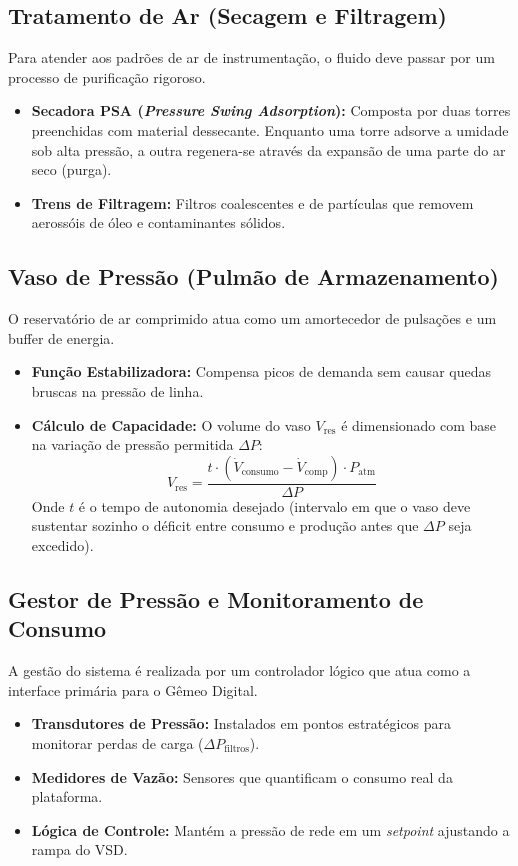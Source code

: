 \documentclass[12pt,a4paper]{article}
\numberwithin{equation}{section}
\numberwithin{table}{section}
\numberwithin{figure}{section}
\begin{document}
	\subsection{\textbf{Tratamento de Ar (Secagem e Filtragem)}}
	Para atender aos padrões de ar de instrumentação, o fluido deve passar por um processo de purificação rigoroso.
	\begin{itemize}
		\item \textbf{Secadora PSA (\textit{Pressure Swing Adsorption}):} Composta por duas torres preenchidas com material dessecante. Enquanto uma torre adsorve a umidade sob alta pressão, a outra regenera-se através da expansão de uma parte do ar seco (purga).
		\item \textbf{Trens de Filtragem:} Filtros coalescentes e de partículas que removem aerossóis de óleo e contaminantes sólidos.
	\end{itemize}
	
	\subsection{\textbf{Vaso de Pressão (Pulmão de Armazenamento)}}
	O reservatório de ar comprimido atua como um amortecedor de pulsações e um buffer de energia.
	\begin{itemize}
		\item \textbf{Função Estabilizadora:} Compensa picos de demanda sem causar quedas bruscas na pressão de linha.
		\item \textbf{Cálculo de Capacidade:} O volume do vaso $V_{\text{res}}$ é dimensionado com base na variação de pressão permitida $\Delta P$:
		\begin{equation}\label{eq:s2-1}
 V_{\text{res}} = \frac{t \cdot (\dot{V}_{\text{consumo}} - \dot{V}_{\text{comp}}) \cdot P_{\text{atm}}}{\Delta P} 
\end{equation}
		Onde $t$ é o tempo de autonomia desejado (intervalo em que o vaso deve sustentar sozinho o déficit entre consumo e produção antes que $\Delta P$ seja excedido).
	\end{itemize}
	
	\subsection{\textbf{Gestor de Pressão e Monitoramento de Consumo}}
	A gestão do sistema é realizada por um controlador lógico que atua como a interface primária para o Gêmeo Digital.
	\begin{itemize}
		\item \textbf{Transdutores de Pressão:} Instalados em pontos estratégicos para monitorar perdas de carga ($\Delta P_{\text{filtros}}$).
		\item \textbf{Medidores de Vazão:} Sensores que quantificam o consumo real da plataforma.
		\item \textbf{Lógica de Controle:} Mantém a pressão de rede em um \textit{setpoint} ajustando a rampa do VSD.
	\end{itemize}
\end{document}
